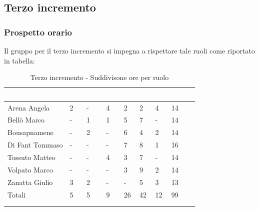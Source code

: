     \subsection{Terzo incremento} 
    {
    \subsubsection{Prospetto orario}
    {
    Il gruppo per il terzo incremento si impegna a rispettare tale ruoli come riportato in tabella:
      \setlength{\freewidth}{\dimexpr\textwidth-30\tabcolsep}
      \renewcommand{\arraystretch}{1.0}
      \setlength{\aboverulesep}{0pt}
      \setlength{\belowrulesep}{0pt}
      \begin{longtable}{C{.4\freewidth} C{.1\freewidth} C{.1\freewidth} C{.1\freewidth} C{.1\freewidth} C{.1\freewidth} C{.1\freewidth} C{.1\freewidth} C{.1\freewidth}}
      \toprule
      \textcolor{white}{\textbf{Componente}}&
      \textcolor{white}{\textbf{Re}}&
      \textcolor{white}{\textbf{Am}}&
      \textcolor{white}{\textbf{An}}&
      \textcolor{white}{\textbf{Pt}}&
      \textcolor{white}{\textbf{Pr}}&
      \textcolor{white}{\textbf{Ve}}&
      \textcolor{white}{\textbf{Ore}}\\
      \toprule
      \endhead

      Arena Angela & 2 & - & 4  & 2 & 2 & 4 & 14 \\      
      Bellò Marco & - & 1 & 1 & 5 & 7 & - & 14 \\      
      Bousapnamene & - & 2 & - & 6 & 4 & 2 & 14 \\      
      Di Fant Tommaso & - & - & - & 7 & 8 & 1 & 16 \\      
      Tossuto Matteo & - & - & 4 & 3 & 7 & - & 14 \\      
      Volpato Marco & - & - & - & 3 & 9 & 2 & 14 \\      
      Zanatta Giulio & 3 & 2 & - & - & 5 & 3 & 13 \\      
      Totali & 5 & 5 & 9 & 26 & 42 & 12 & 99 \\
      \bottomrule
      \\
      \caption{Terzo incremento - Suddivisone ore per ruolo}

      \end{longtable} 

}}
